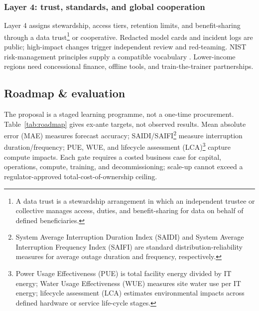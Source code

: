 \documentclass[12pt]{article}
\begin{document}
\subsubsection{Layer 4: trust, standards, and global cooperation}
Layer 4 assigns stewardship, access tiers, retention limits, and benefit-sharing through a data trust\footnote{A data trust is a stewardship arrangement in which an independent trustee or collective manages access, duties, and benefit-sharing for data on behalf of defined beneficiaries.} or cooperative. Redacted model cards and incident logs are public; high-impact changes trigger independent review and red-teaming. NIST risk-management principles supply a compatible vocabulary \cite{nist2023}. Lower-income regions need concessional finance, offline tools, and train-the-trainer partnerships.

\subsection{Roadmap \& evaluation}
The proposal is a staged learning programme, not a one-time procurement. Table~\ref{tab:roadmap} gives ex-ante targets, not observed results. Mean absolute error (MAE) measures forecast accuracy; SAIDI/SAIFI\footnote{System Average Interruption Duration Index (SAIDI) and System Average Interruption Frequency Index (SAIFI) are standard distribution-reliability measures for average outage duration and frequency, respectively.} measure interruption duration/frequency; PUE, WUE, and lifecycle assessment (LCA)\footnote{Power Usage Effectiveness (PUE) is total facility energy divided by IT energy; Water Usage Effectiveness (WUE) measures site water use per IT energy; lifecycle assessment (LCA) estimates environmental impacts across defined hardware or service life-cycle stages.} capture compute impacts. Each gate requires a costed business case for capital, operations, compute, training, and decommissioning; scale-up cannot exceed a regulator-approved total-cost-of-ownership ceiling.
\end{document}
